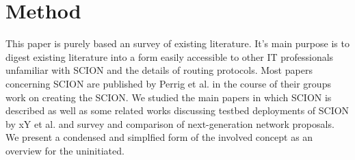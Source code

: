 \documentclass[../eva1_scion.tex]{subfiles}
\begin{document}
    \chapter{Method}\label{ch:method}

   This paper is purely based an survey of existing literature. It's main purpose is to digest existing literature into a form easily accessible to other IT professionals unfamiliar with SCION and the details of routing protocols. Most papers concerning SCION are published by Perrig et al. in the course of their groups work on creating the SCION.
   We studied the main papers in which SCION is described as well as some related works discussing testbed deployments of SCION by xY et al. and survey and comparison of next-generation network proposals. We present a condensed and simplfied form of the involved concept as an overview for the uninitiated.
\end{document}
